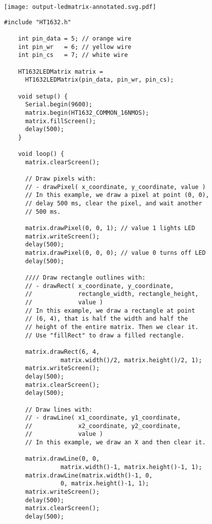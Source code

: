 \vspace{0.1in}
\begin{minipage}[t]{0.49\tw}
  \vspace{0.0in}
  \texttt{[image: output-ledmatrix-annotated.svg.pdf]}
\end{minipage}
\hspace{0.1in}
\begin{minipage}[t]{0.49\tw}
  \vspace{0.1in}
  \begin{Verbatim}[gobble=3,fontsize=\small]
    #include "HT1632.h"

    int pin_data = 5; // orange wire
    int pin_wr   = 6; // yellow wire
    int pin_cs   = 7; // white wire

    HT1632LEDMatrix matrix =
      HT1632LEDMatrix(pin_data, pin_wr, pin_cs);

    void setup() {
      Serial.begin(9600);
      matrix.begin(HT1632_COMMON_16NMOS);
      matrix.fillScreen();
      delay(500);
    }

    void loop() {
      matrix.clearScreen();

      // Draw pixels with:
      // - drawPixel( x_coordinate, y_coordinate, value )
      // In this example, we draw a pixel at point (0, 0),
      // delay 500 ms, clear the pixel, and wait another
      // 500 ms.

      matrix.drawPixel(0, 0, 1); // value 1 lights LED
      matrix.writeScreen();
      delay(500);
      matrix.drawPixel(0, 0, 0); // value 0 turns off LED
      delay(500);

      //// Draw rectangle outlines with:
      // - drawRect( x_coordinate, y_coordinate,
      //             rectangle_width, rectangle_height,
      //             value )
      // In this example, we draw a rectangle at point
      // (6, 4), that is half the width and half the
      // height of the entire matrix. Then we clear it.
      // Use "fillRect" to draw a filled rectangle.

      matrix.drawRect(6, 4,
                matrix.width()/2, matrix.height()/2, 1);
      matrix.writeScreen();
      delay(500);
      matrix.clearScreen();
      delay(500);

      // Draw lines with:
      // - drawLine( x1_coordinate, y1_coordinate,
      //             x2_coordinate, y2_coordinate,
      //             value )
      // In this example, we draw an X and then clear it.

      matrix.drawLine(0, 0,
                matrix.width()-1, matrix.height()-1, 1);
      matrix.drawLine(matrix.width()-1, 0,
                0, matrix.height()-1, 1);
      matrix.writeScreen();
      delay(500);
      matrix.clearScreen();
      delay(500);


\end{Verbatim}
\end{minipage}
